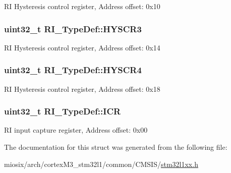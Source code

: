 R\-I Hysteresis control register, Address offset\-: 0x10 \hypertarget{struct_r_i___type_def_a0dd74384be92e97899cb4d7477962d50}{
\subsubsection[{H\-Y\-S\-C\-R3}]{ uint32\-\_\-t R\-I\-\_\-\-Type\-Def\-::\-H\-Y\-S\-C\-R3}}\label{struct_r_i___type_def_a0dd74384be92e97899cb4d7477962d50}
R\-I Hysteresis control register, Address offset\-: 0x14 \hypertarget{struct_r_i___type_def_ad54de1fa4e48c8bd79e0afcfeb2bac27}{
\subsubsection[{H\-Y\-S\-C\-R4}]{ uint32\-\_\-t R\-I\-\_\-\-Type\-Def\-::\-H\-Y\-S\-C\-R4}}\label{struct_r_i___type_def_ad54de1fa4e48c8bd79e0afcfeb2bac27}
R\-I Hysteresis control register, Address offset\-: 0x18 \hypertarget{struct_r_i___type_def_adb5a93377d850e81160dc037c5995029}{
\subsubsection[{I\-C\-R}]{ uint32\-\_\-t R\-I\-\_\-\-Type\-Def\-::\-I\-C\-R}}\label{struct_r_i___type_def_adb5a93377d850e81160dc037c5995029}
R\-I input capture register, Address offset\-: 0x00 

The documentation for this struct was generated from the following file\-:\begin{DoxyCompactItemize}
\item 
miosix/arch/cortex\-M3\-\_\-stm32l1/common/\-C\-M\-S\-I\-S/\hyperlink{stm32l1xx_8h}{stm32l1xx.\-h}\end{DoxyCompactItemize}
